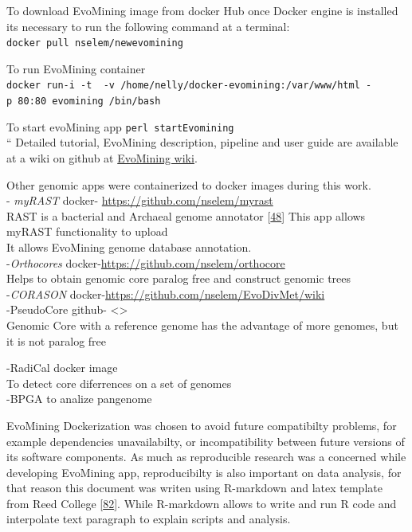 \documentclass[12pt,twoside]{reedthesis}
\begin{document}
  To download EvoMining image from docker Hub once Docker engine is
  installed its necessary to run the following command at a terminal:\\
  \texttt{docker\ pull\ nselem/newevomining}
  
  To run EvoMining container\\
  \texttt{docker\ run-i\ -t\ \ -v\ /home/nelly/docker-evomining:/var/www/html\ -p\ 80:80\ evomining\ /bin/bash}
  
  To start evoMining app \texttt{perl\ startEvomining}\\
  `` Detailed tutorial, EvoMining description, pipeline and user guide are
  available at a wiki on github at
  \href{https://github.com/nselem/EvoMining/wiki}{EvoMining wiki}.
  
  Other genomic apps were containerized to docker images during this
  work.\\
  - \emph{myRAST} docker- \url{https://github.com/nselem/myrast}\\
  RAST is a bacterial and Archaeal genome annotator
  {[}\protect\hyperlink{ref-azizux5frastux5f2008}{48}{]} This app allows
  myRAST functionality to upload\\
  It allows EvoMining genome database annotation.\\
  -\emph{Orthocores} docker-\url{https://github.com/nselem/orthocore}\\
  Helps to obtain genomic core paralog free and construct genomic trees\\
  -\emph{CORASON} docker-\url{https://github.com/nselem/EvoDivMet/wiki}\\
  -PseudoCore github- \textless{}\textgreater{}\\
  Genomic Core with a reference genome has the advantage of more genomes,
  but it is not paralog free
  
  -RadiCal docker image\\
  To detect core diferrences on a set of genomes\\
  -BPGA to analize pangenome
  
  EvoMining Dockerization was chosen to avoid future compatibilty
  problems, for example dependencies unavailabilty, or incompatibility
  between future versions of its software components. As much as
  reproducible research was a concerned while developing EvoMining app,
  reproducibilty is also important on data analysis, for that reason this
  document was writen using R-markdown and latex template from Reed
  College
  {[}\protect\hyperlink{ref-chesterismayux5fupdatedux5f2016}{82}{]}. While
  R-markdown allows to write and run R code and interpolate text paragraph
  to explain scripts and analysis.
  
\end{document}
